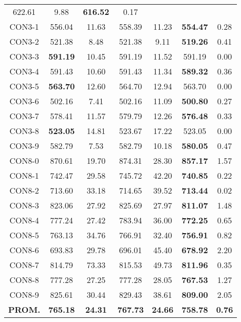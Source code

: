\begin{table}[ht]
\begin{tabular}{c c c c c c c}
622.61 & 9.88 & \bf{616.52} & 
0.17\\CON3-1 & 556.04 & 11.63 & 
558.39 & 11.23 & \bf{554.47} & 
0.28\\CON3-2 & 521.38 & 8.48 & 
521.38 & 9.11 & \bf{519.26} & 
0.41\\CON3-3 & \bf{591.19} & 10.45 & 
591.19 & 11.52 & 591.19 & 0.00\\
CON3-4 & 591.43 & 10.60 & 
591.43 & 11.34 & \bf{589.32} & 
0.36\\CON3-5 & \bf{563.70} & 12.60 & 
564.70 & 12.94 & 563.70 & 0.00\\
CON3-6 & 502.16 & 7.41 & 
502.16 & 11.09 & \bf{500.80} & 
0.27\\CON3-7 & 578.41 & 11.57 & 
579.79 & 12.26 & \bf{576.48} & 
0.33\\CON3-8 & \bf{523.05} & 14.81 & 
523.67 & 17.22 & 523.05 & 0.00\\
CON3-9 & 582.79 & 7.53 & 
582.79 & 10.18 & \bf{580.05} & 
0.47\\CON8-0 & 870.61 & 19.70 & 
874.31 & 28.30 & \bf{857.17} & 
1.57\\CON8-1 & 742.47 & 29.58 & 
745.72 & 42.20 & \bf{740.85} & 
0.22\\CON8-2 & 713.60 & 33.18 & 
714.65 & 39.52 & \bf{713.44} & 
0.02\\CON8-3 & 823.06 & 27.92 & 
825.69 & 27.97 & \bf{811.07} & 
1.48\\CON8-4 & 777.24 & 27.42 & 
783.94 & 36.00 & \bf{772.25} & 
0.65\\CON8-5 & 763.13 & 34.76 & 
766.91 & 32.40 & \bf{756.91} & 
0.82\\CON8-6 & 693.83 & 29.78 & 
696.01 & 45.40 & \bf{678.92} & 
2.20\\CON8-7 & 814.79 & 73.33 & 
815.53 & 49.73 & \bf{811.96} & 
0.35\\CON8-8 & 777.28 & 27.25 & 
777.28 & 28.05 & \bf{767.53} & 
1.27\\CON8-9 & 825.61 & 30.44 & 
829.43 & 38.61 & \bf{809.00} & 
2.05\\\bf{PROM.} & 
\bf{765.18} & \bf{24.31} & \bf{767.73} & \bf{24.66} & \bf{758.78} & \bf{0.76}\\[1ex]\hline
\end{tabular}
\label{table:nonlin}
\end{table} \clearpage
